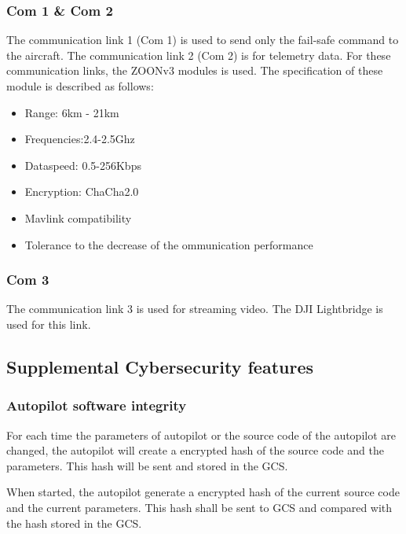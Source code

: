 \documentclass[]{article}
\begin{document}
\subsubsection{Com 1 \& Com 2}
The communication link 1 (Com 1) is used to send only the fail-safe command to the aircraft. The communication link 2 (Com 2) is for telemetry data. For these communication links, the ZOONv3 modules is used. The specification of these module is described as follows:
\begin{itemize}
	\item Range: 6km - 21km
	\item Frequencies:2.4-2.5Ghz
	\item Dataspeed: 0.5-256Kbps
	\item Encryption: ChaCha2.0
	\item Mavlink compatibility
	\item Tolerance to the decrease of the ommunication performance
\end{itemize}

\subsubsection{Com 3}
The communication link 3 is used for streaming video. The DJI Lightbridge is used for this link.

\subsection{Supplemental Cybersecurity features} \label{sub:cybersecurity}
\subsubsection{Autopilot software integrity}

For each time the parameters of autopilot or the source code of the autopilot are changed, the autopilot will create a encrypted hash of the source code and the parameters. This hash will be sent and stored in the GCS. 

When started, the autopilot generate a encrypted hash of the current source code and the current parameters. This hash shall be sent to GCS and compared with the hash stored in the GCS.  
\end{document}
